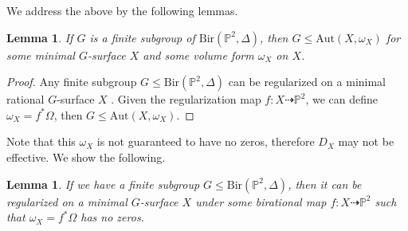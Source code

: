 \documentclass[a4paper,12pt,oneside]{amsart}
\numberwithin{equation}{section}
\newtheorem{lemma}[theorem]{Lemma}
\theoremstyle{definition}
\theoremstyle{remark}
\newcommand{\PP}{\mathbb{P}}
\newcommand{\Ptwo}{\mathbb{P}^2}
\newcommand{\Bir}{\mathrm{Bir}}
\begin{document}
We address the above by the following lemmas.
\begin{lemma} If $G$ is a finite subgroup of $ \mathrm{Bir}(\mathbb{P}^2,\Delta)$, then $G\leqslant \mathrm{Aut}(X,\omega_X)$ for some minimal $G$-surface $X$ and some volume form $\omega_X$ on $X$.
\end{lemma}
\begin{proof}
Any finite subgroup $G\leqslant \Bir(\PP^2,\Delta)$ can be regularized on a minimal rational $G$-surface $X$ \cite[Lemma 3.5]{dolgachev2009finitesubgroupsplanecremona}. Given the regularization map $f: X\dashrightarrow \Ptwo$, we can define $\omega_X = f^*\Omega$, then $G\leqslant \mathrm{Aut}(X,\omega_X)$.
\end{proof}
Note that this $\omega_X$ is not guaranteed to have no zeros, therefore $D_X$ may not be effective. We show the following.
\begin{lemma}\label{lemm}
If we have a finite subgroup $G\leqslant \mathrm{Bir}(\mathbb{P}^2, \Delta)$, then it can be regularized on a minimal $G$-surface $X$ under some birational map $f: X \dashrightarrow \mathbb{P}^2$ such that $\omega_X = f^*\Omega$ has no zeros.
\end{lemma}
\end{document}
